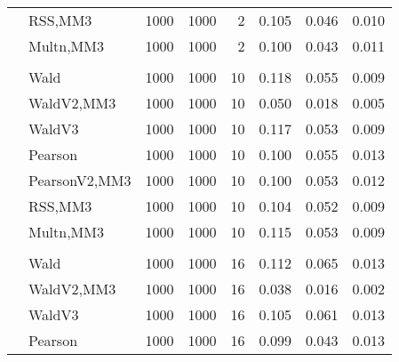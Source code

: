 \documentclass[
]{article}
\begin{document}
\begin{table}[H]
{\begin{tabular}[t]{llrrrrrr}
\hspace{1em} & RSS,MM3 & 1000 & 1000 & 2 & 0.105 & 0.046 & 0.010\\

\hspace{1em} & Multn,MM3 & 1000 & 1000 & 2 & 0.100 & 0.043 & 0.011\\
\cmidrule{1-8}
\addlinespace[0.3em]
\multicolumn{8}{l}{\textbf{1F 15V}}\\
\hspace{1em} & Wald & 1000 & 1000 & 10 & 0.118 & 0.055 & 0.009\\

\hspace{1em} & WaldV2,MM3 & 1000 & 1000 & 10 & 0.050 & 0.018 & 0.005\\

\hspace{1em} & WaldV3 & 1000 & 1000 & 10 & 0.117 & 0.053 & 0.009\\

\hspace{1em} & Pearson & 1000 & 1000 & 10 & 0.100 & 0.055 & 0.013\\

\hspace{1em} & PearsonV2,MM3 & 1000 & 1000 & 10 & 0.100 & 0.053 & 0.012\\

\hspace{1em} & RSS,MM3 & 1000 & 1000 & 10 & 0.104 & 0.052 & 0.009\\

\hspace{1em} & Multn,MM3 & 1000 & 1000 & 10 & 0.115 & 0.053 & 0.009\\
\cmidrule{1-8}
\addlinespace[0.3em]
\multicolumn{8}{l}{\textbf{2F 10V}}\\
\hspace{1em} & Wald & 1000 & 1000 & 16 & 0.112 & 0.065 & 0.013\\

\hspace{1em} & WaldV2,MM3 & 1000 & 1000 & 16 & 0.038 & 0.016 & 0.002\\

\hspace{1em} & WaldV3 & 1000 & 1000 & 16 & 0.105 & 0.061 & 0.013\\

\hspace{1em} & Pearson & 1000 & 1000 & 16 & 0.099 & 0.043 & 0.013\\


\end{tabular}}
\end{table}
\end{document}
